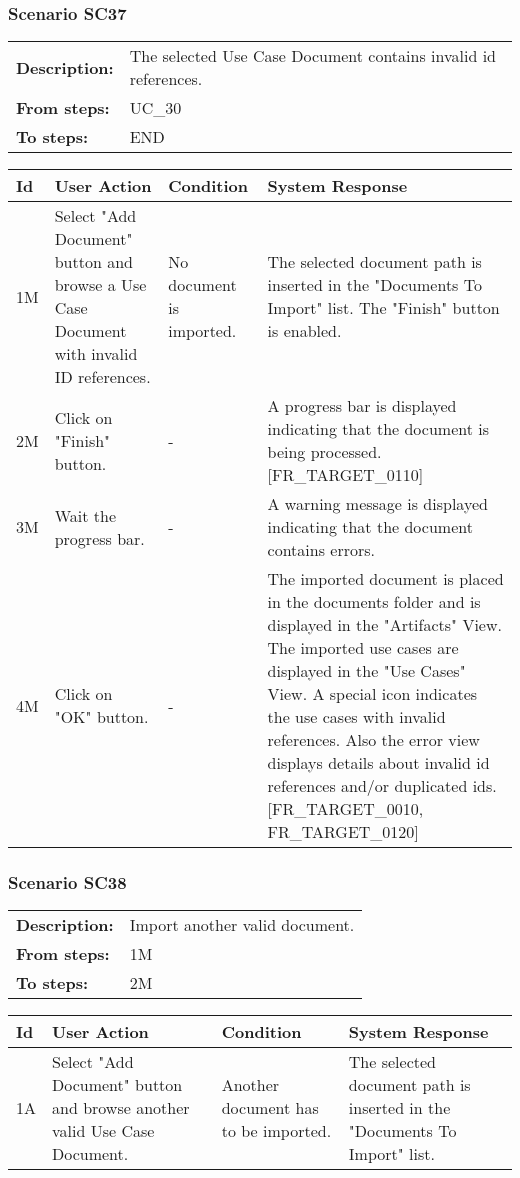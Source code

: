 \documentclass[a4paper,11pt]{article}
\newcommand{\bl}{\\ \hline}
\begin{document}
\subsubsection*{Scenario SC37}
\begin{tabular}{p{1in}p{4in}}
{\bf Description:} & The selected Use Case Document contains invalid id
					references. \\
{\bf From steps:} & UC_30#2M \\
{\bf To steps:} & END \\
\end{tabular}
 
\begin{tabular}{|p{0.8in}|p{1.6in}|p{1.6in}|p{1.6in}|}
\hline
Id & User Action & Condition & System Response  \bl 
1M & Select "Add Document" button and browse a Use Case Document
						with invalid ID references.  & No document is imported. & The selected document path is inserted in the "Documents
						To Import" list. The "Finish" button is enabled. \bl 
2M & Click on "Finish" button. & - & A progress bar is displayed indicating that the document
						is being processed. [FR_TARGET_0110] \bl 
3M & Wait the progress bar. & - & A warning message is displayed indicating that the
						document contains errors. \bl 
4M & Click on "OK" button. & - & The imported document is placed in the documents folder
						and is displayed in the "Artifacts" View. The imported use cases
						are displayed in the "Use Cases" View. A special icon indicates
						the use cases with invalid references. Also the error view
						displays details about invalid id references and/or duplicated
						ids. [FR_TARGET_0010, FR_TARGET_0120] \bl 
\end{tabular}
\subsubsection*{Scenario SC38}
\begin{tabular}{p{1in}p{4in}}
{\bf Description:} & Import another valid document. \\
{\bf From steps:} & 1M \\
{\bf To steps:} & 2M \\
\end{tabular}
 
\begin{tabular}{|p{0.8in}|p{1.6in}|p{1.6in}|p{1.6in}|}
\hline
Id & User Action & Condition & System Response  \bl 
1A & Select "Add Document" button and browse another valid Use
						Case Document.  & Another document has to be imported. & The selected document path is inserted in the "Documents
						To Import" list. \bl 
\end{tabular}
\end{document}
